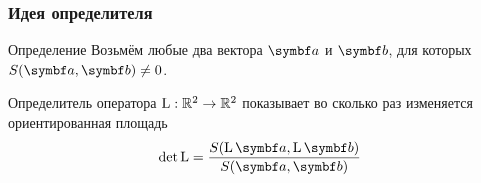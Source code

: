 \begin{frame}
\begin{minipage}[H]{0.48\linewidth}

    \end{minipage}
    

    

\end{frame}



\begin{frame}
    \frametitle{Идея определителя}

\begin{block}{Определение}
    Возьмём любые два вектора $\ba$ и $\bb$, для которых $S(\ba, \bb)\neq 0$.

    \alert{Определитель} оператора $\operatorname{L}:\mathbb{R}^2 \to \mathbb{R}^2$ показывает во сколько раз изменяется
    ориентированная площадь
    \[
    \det \LL = \frac{S(\LL\ba, \LL\bb)}{S(\ba, \bb)}    
    \]
\end{block}    
    

\end{frame}






